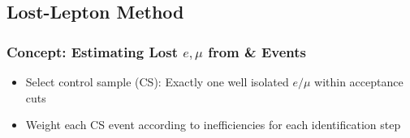\documentclass{beamer}
\begin{document}
\subsection{Lost-Lepton Method}
\begin{frame}
\frametitle{Concept: Estimating Lost $e,\mu$ from \wpj \& \ttbar Events}
 \begin{center}
 \end{center}
  \begin{itemize}
  \item Select control sample (CS): Exactly one well isolated $e/\mu$ within acceptance cuts
  \item Weight each CS event according to inefficiencies for each identification step
 \end{itemize}
\end{frame}
\end{document}
